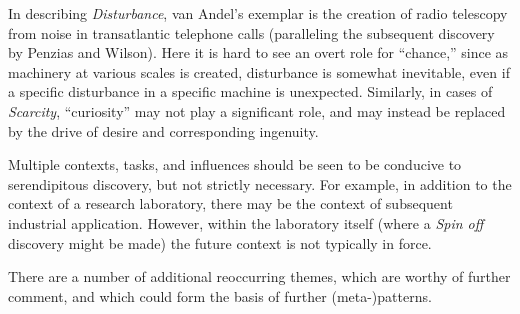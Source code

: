 \documentclass{llncs}
\begin{document}
In describing \emph{Disturbance}, van Andel's exemplar is the
creation of radio telescopy from noise in transatlantic telephone calls
(paralleling the subsequent discovery by Penzias and Wilson).  Here it
is hard to see an overt role for ``chance,'' since as machinery at
various scales is created, disturbance is somewhat inevitable, even if
a specific disturbance in a specific machine is unexpected.
Similarly, in cases of \emph{Scarcity}, ``curiosity'' may not play a
significant role, and may instead be replaced by the drive of desire
and corresponding ingenuity.

Multiple contexts, tasks, and influences should be seen to be
conducive to serendipitous discovery, but not strictly necessary.  For
example, in addition to the context of a research laboratory, there
may be the context of subsequent industrial application.  However,
within the laboratory itself (where a \emph{Spin off} discovery might
be made) the future context is not typically in force.

There are a number of additional reoccurring themes, which are worthy
of further comment, and which could form the basis of further
(meta-)patterns.
\end{document}
